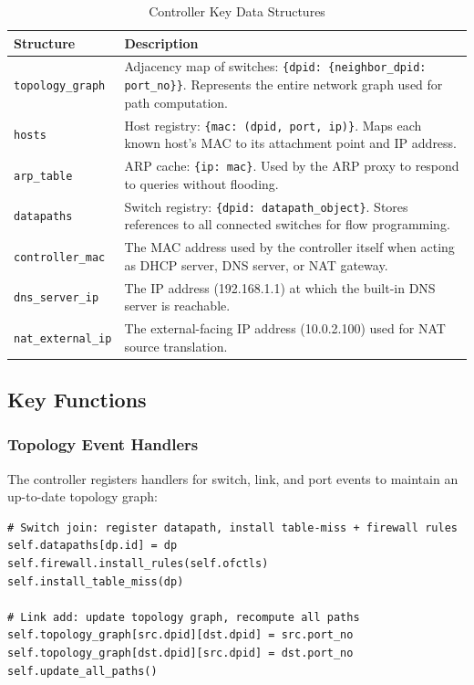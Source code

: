 \documentclass[12pt,a4paper]{article}
\begin{document}
\begin{table}[H]
\centering
\begin{tabular}{@{}lp{8.5cm}@{}}
\toprule
\textbf{Structure} & \textbf{Description} \\
\midrule
\texttt{topology\_graph} & Adjacency map of switches: \texttt{\{dpid: \{neighbor\_dpid: port\_no\}\}}. Represents the entire network graph used for path computation. \\
\texttt{hosts} & Host registry: \texttt{\{mac: (dpid, port, ip)\}}. Maps each known host's MAC to its attachment point and IP address. \\
\texttt{arp\_table} & ARP cache: \texttt{\{ip: mac\}}. Used by the ARP proxy to respond to queries without flooding. \\
\texttt{datapaths} & Switch registry: \texttt{\{dpid: datapath\_object\}}. Stores references to all connected switches for flow programming. \\
\texttt{controller\_mac} & The MAC address used by the controller itself when acting as DHCP server, DNS server, or NAT gateway. \\
\texttt{dns\_server\_ip} & The IP address (192.168.1.1) at which the built-in DNS server is reachable. \\
\texttt{nat\_external\_ip} & The external-facing IP address (10.0.2.100) used for NAT source translation. \\
\bottomrule
\end{tabular}
\caption{Controller Key Data Structures}
\end{table}

\subsection{Key Functions}

\subsubsection{Topology Event Handlers}

The controller registers handlers for switch, link, and port events to maintain an up-to-date topology graph:

\begin{lstlisting}[caption={Switch and Link Event Handlers}]
# Switch join: register datapath, install table-miss + firewall rules
self.datapaths[dp.id] = dp
self.firewall.install_rules(self.ofctls)
self.install_table_miss(dp)

# Link add: update topology graph, recompute all paths
self.topology_graph[src.dpid][dst.dpid] = src.port_no
self.topology_graph[dst.dpid][src.dpid] = dst.port_no
self.update_all_paths()
\end{lstlisting}
\end{document}
